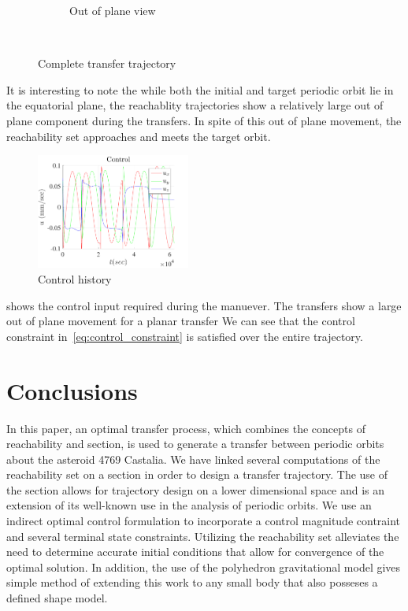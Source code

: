 \documentclass[]{aiaa-tc}%
\begin{document}
\begin{figure}[htbp]
\begin{subfigure}[htbp]{0.45\textwidth}
        \caption{Out of plane view} \label{fig:trajectory_3d} 
    \end{subfigure}~ %
    \caption{Complete transfer trajectory}
    \label{fig:trajectory} 
\end{figure}
It is interesting to note the while both the initial and target periodic orbit lie in the equatorial plane, the reachablity trajectories show a relatively large out of plane component during the transfers.
In spite of this out of plane movement, the reachability set approaches and meets the target orbit. 
\begin{figure}
    \centering
    \includegraphics[width=0.45\textwidth]{figures/control.pdf}
    \caption{Control history \label{fig:control}}
\end{figure}
 shows the control input required during the manuever.
The transfers show a large out of plane movement for a planar transfer
We can see that the control constraint in~\cref{eq:control_constraint} is satisfied over the entire trajectory.

\section{Conclusions}\label{sec:conclusions}

In this paper, an optimal transfer process, which combines the concepts of reachability and \Poincare section, is used to generate a transfer between periodic orbits about the asteroid 4769 Castalia.
We have linked several computations of the reachability set on a \Poincare section in order to design a transfer trajectory.
The use of the \Poincare section allows for trajectory design on a lower dimensional space and is an extension of its well-known use in the analysis of periodic orbits.
We use an indirect optimal control formulation to incorporate a control magnitude contraint and several terminal state constraints.
Utilizing the reachability set alleviates the need to determine accurate initial conditions that allow for convergence of the optimal solution.
In addition, the use of the polyhedron gravitational model gives simple method of extending this work to any small body that also posseses a defined shape model.



\end{document}
